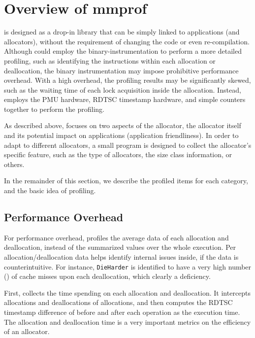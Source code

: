 \section{Overview of mmprof}

\MP{} is designed as a drop-in library that can be simply linked to applications (and allocators), without the requirement of changing the code or even re-compilation. Although \MP{} could employ the binary-instrumentation to perform a more detailed profiling, such as identifying the instructions within each allocation or deallocation, the binary instrumentation may impose prohibitive performance overhead. With a high overhead, the profiling results may be significantly skewed, such as the waiting time of each lock acquisition inside the allocation. Instead, \MP{} employs the PMU hardware, RDTSC timestamp hardware, and simple counters together to perform the profiling.  
 
As described above, \MP{} focuses on two aspects of the allocator, the allocator itself and its potential impact on applications (application friendliness). In order to adapt to different allocators, a small program is designed to collect the allocator's specific feature, such as the type of allocators, the size class information, or others. 

In the remainder of this section, we describe the profiled items for each category, and the basic idea of profiling. 

\subsection{Performance Overhead}

For performance overhead, \MP{} profiles the average data of each allocation and deallocation, instead of the summarized values over the whole execution. Per allocation/deallocation data helps identify internal issues inside, if the data is counterintuitive. For instance, \texttt{DieHarder} is identified to have a very high number () of cache misses upon each deallocation, which clearly a deficiency. 

First, \MP{} collects the time spending on each allocation and deallocation. It intercepts allocations and deallocations of allocations, and then computes the RDTSC timestamp difference of before and after each operation as the execution time. The allocation and deallocation time is a very important metrics on the efficiency of an allocator.  

% 

